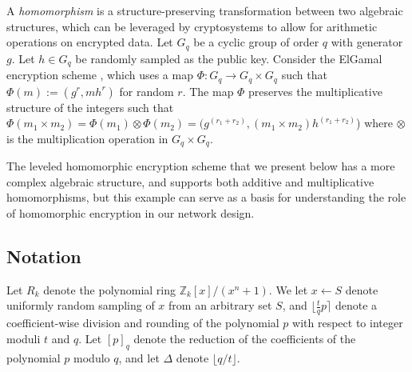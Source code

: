 \documentclass[conference]{IEEEtran}
\begin{document}
A \textit{homomorphism} is a structure-preserving transformation between two algebraic structures, which can be leveraged by cryptosystems to allow for arithmetic operations on encrypted data. 
Let $G_q$ be a cyclic group of order $q$ with generator $g$. Let $h \in G_q$ be randomly sampled as the public key.
Consider the ElGamal encryption scheme \cite{elgamal1985public}, which uses a map $\Phi: G_q \rightarrow  G_q \times G_q$ such that $\Phi(m) := (g^r, mh^r)$ for random $r$. 
The map $\Phi$ preserves the multiplicative structure of the integers such that $\Phi(m_1 \times m_2) = \Phi(m_1) \otimes \Phi(m_2) = (g^{(r_1+r_2)}, (m_1 \times m_2)h^{(r_1+r_2)}$) where $\otimes$ is the multiplication operation in $G_q \times  G_q$.

The leveled homomorphic encryption scheme that we present below has a more complex algebraic structure, and supports both additive and multiplicative homomorphisms, but this example can serve as a basis for understanding the role of homomorphic encryption in our network design.

\subsection{Notation}
Let $R_k$ denote the polynomial ring $\mathbb{Z}_k[x]/(x^n + 1)$.
We let $x \leftarrow S$ denote uniformly random sampling of $x$ from an arbitrary set $S$, and $\lfloor \frac{t}{q} p \rceil$ denote a coefficient-wise division and rounding of the polynomial $p$ with respect to integer moduli $t$ and $q$.
Let $[p]_q$ denote the reduction of the coefficients of the polynomial $p$ modulo $q$, and let $\Delta$ denote $\lfloor {q/t} \rfloor$.

\end{document}
